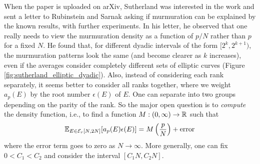 When the paper is uploaded on arXiv, Sutherland was interested in the work and sent a letter to Rubinstein and Sarnak \cite{sutherlandletter} asking if murmuration can be explained by the known results, with further experiments.
In his letter, he observed that one really needs to view the murmuration density as a function of $p / N$ rather than $p$ for a fixed $N$.
He found that, for different dyadic intervals of the form $[2^k, 2^{k+1})$, the murmuration patterns look the same (and become clearer as $k$ increases), even if the averages consider completely different sets of elliptic curves (Figure \ref{fig:sutherland_elliptic_dyadic}).
Also, instead of considering each rank separately, it seems better to consider all ranks together, where we weight $a_p(E)$ by the root number $\epsilon(E)$ of $E$.
One can separate into two groups depending on the parity of the rank.
So the major open question is to \emph{compute} the density function, i.e., to find a function $M: (0, \infty) \to \mathbb{R}$ such that
\begin{equation}
    \mathbb{E}_{E \in \mathcal{E}_r[N, 2N]} [a_p(E)\epsilon(E)] = M\left(\frac{p}{N}\right) + \text{error}
\end{equation}
where the error term goes to zero as $N \to \infty$. More generally, one can fix $0 < C_1 < C_2$ and consider the interval $[C_1 N, C_2 N]$.

